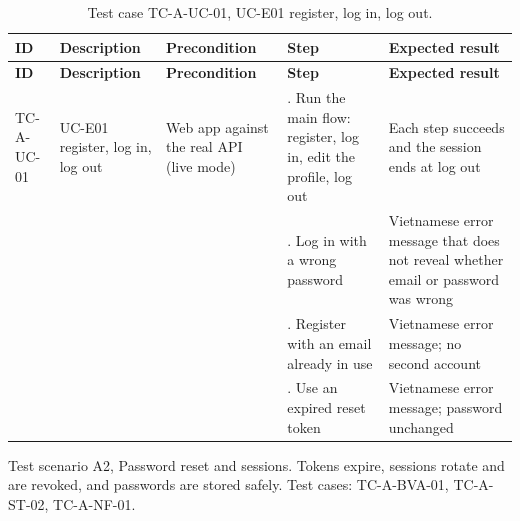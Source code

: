 {\small
\begin{longtable}{|>{\raggedright\arraybackslash}p{}|>{\raggedright\arraybackslash}p{}|>{\raggedright\arraybackslash}p{}|>{\raggedright\arraybackslash}p{}|>{\raggedright\arraybackslash}p{}|}
\caption{Test case TC-A-UC-01, UC-E01 register, log in, log out.} \\
\hline
\textbf{ID} & \textbf{Description} & \textbf{Precondition} & \textbf{Step} & \textbf{Expected result} \\ \hline
\endfirsthead
\hline
\textbf{ID} & \textbf{Description} & \textbf{Precondition} & \textbf{Step} & \textbf{Expected result} \\ \hline
\endhead
TC-A-UC-01 & UC-E01 register, log in, log out & Web app against the real API (live mode) & 1. Run the main flow: register, log in, edit the profile, log out & Each step succeeds and the session ends at log out \\ \hline
 &  &  & 2. Log in with a wrong password & Vietnamese error message that does not reveal whether email or password was wrong \\ \hline
 &  &  & 3. Register with an email already in use & Vietnamese error message; no second account \\ \hline
 &  &  & 4. Use an expired reset token & Vietnamese error message; password unchanged \\ \hline
\end{longtable}
}

Test scenario A2, Password reset and sessions. Tokens expire, sessions rotate and are revoked, and passwords are stored safely. Test cases: TC-A-BVA-01, TC-A-ST-02, TC-A-NF-01.

